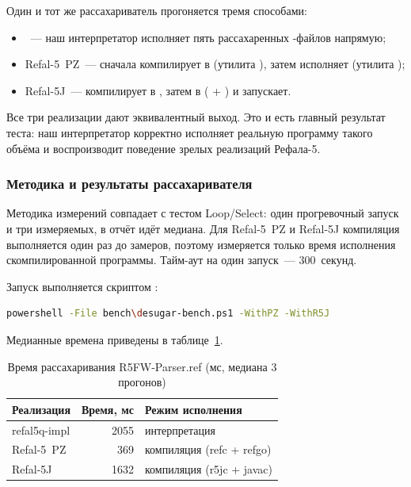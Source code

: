 Один и тот же рассахариватель прогоняется тремя способами:
\begin{itemize}
  \item {}~--- наш интерпретатор исполняет пять
        рассахаренных -файлов напрямую;
  \item Refal-5~PZ~--- сначала компилирует  в 
        (утилита ), затем исполняет (утилита );
  \item Refal-5J~--- компилирует  в , затем в
         ( + ) и запускает.
\end{itemize}

Все три реализации дают эквивалентный выход. Это и есть
главный результат теста: наш интерпретатор корректно исполняет реальную
программу такого объёма и воспроизводит поведение зрелых реализаций Рефала-5.

\subsubsection{Методика и результаты рассахаривателя}

Методика измерений совпадает с тестом Loop/Select: один прогревочный запуск
и три измеряемых, в отчёт идёт медиана. Для Refal-5~PZ и Refal-5J компиляция
выполняется один раз до замеров, поэтому измеряется только время исполнения
скомпилированной программы. Тайм-аут на один запуск~--- 300~секунд.

Запуск выполняется скриптом :

\begin{lstlisting}[language=bash,caption={Запуск бенчмарка рассахаривателя},label={lst:desugar-bench-run}]
powershell -File bench\desugar-bench.ps1 -WithPZ -WithR5J
\end{lstlisting}

Медианные времена приведены в таблице~\ref{tab:desugar-results}.

\begin{table}[!htb]
\caption{\centering Время рассахаривания R5FW-Parser.ref (мс, медиана 3 прогонов)}
\label{tab:desugar-results}
\centering
\small
\begin{tabular}{|l|r|l|}
\hline
\textbf{Реализация} & \textbf{Время, мс} & \textbf{Режим исполнения} \\
\hline
refal5q-impl & 2055 & интерпретация \\
\hline
Refal-5~PZ   & 369  & компиляция (refc + refgo) \\
\hline
Refal-5J     & 1632 & компиляция (r5jc + javac) \\
\hline
\end{tabular}
\end{table}

